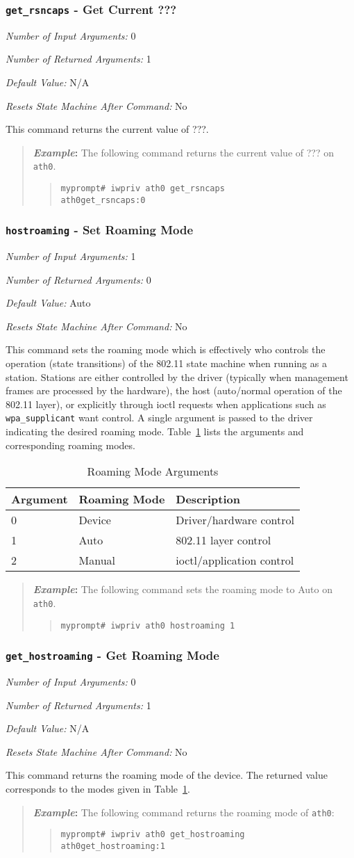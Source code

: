 \documentclass[10pt,fullpage]{article}
\newcommand{\mytt}[1]{{\texttt{#1}}}
\newcommand{\bv}{\begin{verse}}
\newcommand{\ev}{\end{verse}}
\newcommand{\cmd}[1]{{\texttt{myprompt\# #1}}}
\newcommand{\argdesc}[4]{\begin{description}
\itemsep -6pt
\item \textit{Number of Input Arguments:} #1
\item \textit{Number of Returned Arguments:} #2
\item \textit{Default Value:} #3
\item \textit{Resets State Machine After Command:} #4
\end{description}
}
\newenvironment{example}{\begin{quote}\textbf{\textit{Example}:}}{\end{quote}}
\begin{document}
\subsubsection{\mytt{get\_rsncaps} - Get Current ???}
\argdesc{0}{1}{N/A}{No}
This command returns the current value of ???.
\begin{example}
  The following command returns the current value of ??? on
  \mytt{ath0}.
  \bv
  \cmd{iwpriv ath0 get\_rsncaps}\\
  \mytt{ath0\hspace{32pt}get\_rsncaps:0}
  \ev
\end{example}

\subsubsection{\mytt{hostroaming} - Set Roaming Mode}
\argdesc{1}{0}{Auto}{No}
This command sets the roaming mode which is effectively who controls
the operation (state transitions) of the 802.11 state machine when
running as a station.  Stations are either controlled by the driver
(typically when management frames are processed by the hardware), the
host (auto/normal operation of the 802.11 layer), or explicitly
through ioctl requests when applications such as
\mytt{wpa\_supplicant} want control. A single argument is passed to
the driver indicating the desired roaming mode.
Table~\ref{tab:roaming} lists the arguments and corresponding roaming
modes.
\begin{table}[h*]
  \centering
  \begin{tabular}{|l|l|l|} \hline
    Argument & Roaming Mode & Description \\ \hline
    0 & Device & Driver/hardware control \\
    1 & Auto & 802.11 layer control \\
    2 & Manual & ioctl/application control \\ \hline
  \end{tabular}
  \caption{Roaming Mode Arguments}
  \label{tab:roaming}
\end{table}
\begin{example}
  The following command sets the roaming mode to Auto on \mytt{ath0}.
  \bv
  \cmd{iwpriv ath0 hostroaming 1}
  \ev
\end{example}

\subsubsection{\mytt{get\_hostroaming} - Get Roaming Mode}
\argdesc{0}{1}{N/A}{No}
This command returns the roaming mode of the device.  The returned
value corresponds to the modes given in Table~\ref{tab:roaming}.
\begin{example}
  The following command returns the roaming mode of \mytt{ath0}:
  \bv
  \cmd{iwpriv ath0 get\_hostroaming}\\
  \mytt{ath0\hspace{32pt}get\_hostroaming:1}
  \ev
\end{example}
\end{document}

